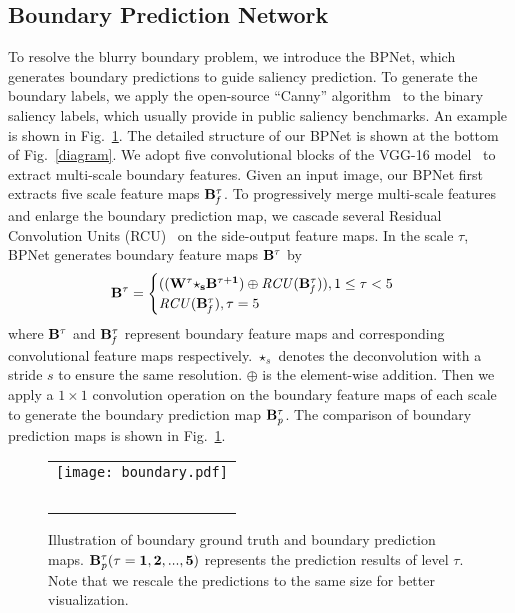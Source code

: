 \documentclass[journal]{IEEEtran}
\begin{document}
\subsection{Boundary Prediction Network}
\label{Boundary Prediction Network}
To resolve the blurry boundary problem, we introduce the BPNet, which generates boundary predictions to guide saliency prediction.
%
To generate the boundary labels, we apply the open-source ``Canny” algorithm~\cite{Canny} to the binary saliency labels,  which usually provide in public saliency benchmarks. An example is shown in Fig.~\ref{boundary}.
%
The detailed structure of our BPNet is shown at the bottom of Fig.~\ref{diagram}.
%
We adopt five convolutional blocks of the VGG-16 model~\cite{simonyan2014very} to extract multi-scale boundary features.
%
Given an input image, our BPNet first extracts five scale feature maps $\bf{B}^{\tau}_{\it{f}}$.
%
%
To progressively merge multi-scale features and enlarge the boundary prediction map, we cascade several Residual Convolution Units (RCU)~\cite{Lin2017RefineNet} on the side-output feature maps.
%
In the scale $\tau$, BPNet generates boundary feature maps $\bf{B}^{\tau}$ by
\begin{equation}
\begin{aligned}
\bf{B}^{\tau}=
\begin{cases}
((\bf{W}^{\tau}{\star}_{s}\bf{B}^{{\tau}+1})\oplus \it{RCU}(\bf{B}_{\it{f}}^{\tau})),\rm{1}\le\it{\tau}<\rm{5}\\
\it{RCU}(\bf{B}_{\it{f}}^{\tau}),\it{\tau}=\rm{5}
\end{cases}
\label{boundary feature map}
\end{aligned}
\end{equation}
where $\bf{B}^{\it{\tau}}$ and $\bf{B}_{\it{f}}^{\it{\tau}}$ represent boundary feature maps and corresponding convolutional feature maps respectively.
%
${\star}_{s}$ denotes the deconvolution with a stride $s$ to ensure the same resolution.
%
$\oplus$ is the element-wise addition.
%
Then we apply a $1\times1$ convolution operation on the boundary feature maps of each scale to generate the boundary prediction map $\bf{B}^{\tau}_{\it{p}}$.
%
The comparison of boundary prediction maps is shown in Fig.~\ref{boundary}.
%
\begin{figure}[!t]
\centering
\begin{tabular}{@{}c}
\texttt{[image: boundary.pdf]} \\\
\end{tabular}
\caption{Illustration of boundary ground truth and boundary prediction maps. $\bf{B}^{\tau}_{\it{p}} (\tau=1,2,...,5)$ represents the prediction results of level $\tau$. Note that we rescale the predictions to the same size for better visualization.}
\vspace{-6mm}
\label{boundary}
\end{figure}
\vspace{-2mm}
\end{document}
